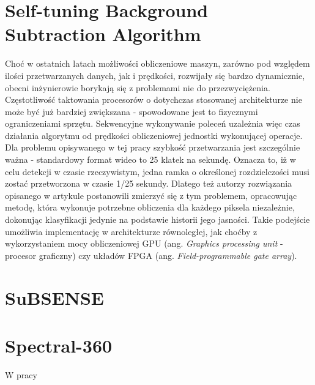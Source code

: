 \section{Self-tuning Background Subtraction Algorithm}
Choć w ostatnich latach możliwości obliczeniowe maszyn, zarówno pod względem ilości przetwarzanych danych, jak i prędkości, rozwijały się bardzo dynamicznie, obecni inżynierowie borykają się z problemami nie do przezwyciężenia. Częstotliwość taktowania procesorów o dotychczas stosowanej architekturze nie może być już bardziej zwiększana - spowodowane jest to fizycznymi ograniczeniami sprzętu. Sekwencyjne wykonywanie poleceń uzależnia więc czas działania algorytmu od prędkości obliczeniowej jednostki wykonującej operacje. Dla problemu opisywanego w tej pracy szybkość przetwarzania jest szczególnie ważna - standardowy format wideo to 25 klatek na sekundę. Oznacza to, iż w celu detekcji w czasie rzeczywistym, jedna ramka o określonej rozdzielczości musi zostać przetworzona w czasie 1/25 sekundy. Dlatego też autorzy rozwiązania opisanego w artykule \cite{6910012} postanowili zmierzyć się z tym problemem, opracowując metodę, która wykonuje potrzebne obliczenia dla każdego piksela niezależnie, dokonując klasyfikacji jedynie na podstawie historii jego jasności. Takie podejście umożliwia implementację w architekturze równoległej, jak choćby z wykorzystaniem mocy obliczeniowej GPU (ang. \textit{Graphics processing unit} - procesor graficzny) czy układów FPGA (ang. \textit{Field-programmable gate array}).

\section{SuBSENSE}
\cite{stflexible}
\section{Spectral-360}
W pracy \cite{6910013}


